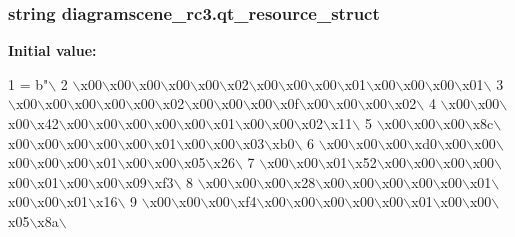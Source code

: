 \subsubsection[{qt\+\_\+resource\+\_\+struct}]{\setlength{\rightskip}{0pt plus 5cm}string diagramscene\+\_\+rc3.\+qt\+\_\+resource\+\_\+struct}\label{namespacediagramscene__rc3_a9e330b06b713d5f5dc988c31319b14d1}
{\bfseries Initial value\+:}
\begin{DoxyCode}
1 = b\textcolor{stringliteral}{"\(\backslash\)}
2 \textcolor{stringliteral}{\(\backslash\)x00\(\backslash\)x00\(\backslash\)x00\(\backslash\)x00\(\backslash\)x00\(\backslash\)x02\(\backslash\)x00\(\backslash\)x00\(\backslash\)x00\(\backslash\)x01\(\backslash\)x00\(\backslash\)x00\(\backslash\)x00\(\backslash\)x01\(\backslash\)}
3 \textcolor{stringliteral}{\(\backslash\)x00\(\backslash\)x00\(\backslash\)x00\(\backslash\)x00\(\backslash\)x00\(\backslash\)x02\(\backslash\)x00\(\backslash\)x00\(\backslash\)x00\(\backslash\)x0f\(\backslash\)x00\(\backslash\)x00\(\backslash\)x00\(\backslash\)x02\(\backslash\)}
4 \textcolor{stringliteral}{\(\backslash\)x00\(\backslash\)x00\(\backslash\)x00\(\backslash\)x42\(\backslash\)x00\(\backslash\)x00\(\backslash\)x00\(\backslash\)x00\(\backslash\)x00\(\backslash\)x01\(\backslash\)x00\(\backslash\)x00\(\backslash\)x02\(\backslash\)x11\(\backslash\)}
5 \textcolor{stringliteral}{\(\backslash\)x00\(\backslash\)x00\(\backslash\)x00\(\backslash\)x8c\(\backslash\)x00\(\backslash\)x00\(\backslash\)x00\(\backslash\)x00\(\backslash\)x00\(\backslash\)x01\(\backslash\)x00\(\backslash\)x00\(\backslash\)x03\(\backslash\)xb0\(\backslash\)}
6 \textcolor{stringliteral}{\(\backslash\)x00\(\backslash\)x00\(\backslash\)x00\(\backslash\)xd0\(\backslash\)x00\(\backslash\)x00\(\backslash\)x00\(\backslash\)x00\(\backslash\)x00\(\backslash\)x01\(\backslash\)x00\(\backslash\)x00\(\backslash\)x05\(\backslash\)x26\(\backslash\)}
7 \textcolor{stringliteral}{\(\backslash\)x00\(\backslash\)x00\(\backslash\)x01\(\backslash\)x52\(\backslash\)x00\(\backslash\)x00\(\backslash\)x00\(\backslash\)x00\(\backslash\)x00\(\backslash\)x01\(\backslash\)x00\(\backslash\)x00\(\backslash\)x09\(\backslash\)xf3\(\backslash\)}
8 \textcolor{stringliteral}{\(\backslash\)x00\(\backslash\)x00\(\backslash\)x00\(\backslash\)x28\(\backslash\)x00\(\backslash\)x00\(\backslash\)x00\(\backslash\)x00\(\backslash\)x00\(\backslash\)x01\(\backslash\)x00\(\backslash\)x00\(\backslash\)x01\(\backslash\)x16\(\backslash\)}
9 \textcolor{stringliteral}{\(\backslash\)x00\(\backslash\)x00\(\backslash\)x00\(\backslash\)xf4\(\backslash\)x00\(\backslash\)x00\(\backslash\)x00\(\backslash\)x00\(\backslash\)x00\(\backslash\)x01\(\backslash\)x00\(\backslash\)x00\(\backslash\)x05\(\backslash\)x8a\(\backslash\)}

\end{DoxyCode}
